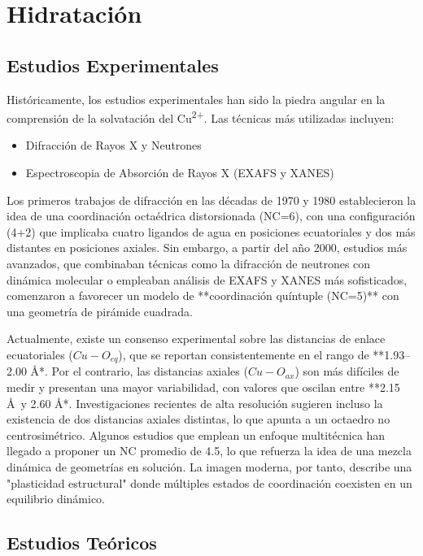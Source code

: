 \section{Hidratación}

\subsection*{Estudios Experimentales}

Históricamente, los estudios experimentales han sido la piedra angular en la comprensión de la solvatación del Cu\textsuperscript{2+}. Las técnicas más utilizadas incluyen:
\begin{itemize}
    \item Difracción de Rayos X y Neutrones
    \item Espectroscopia de Absorción de Rayos X (EXAFS y XANES)
\end{itemize}

Los primeros trabajos de difracción en las décadas de 1970 y 1980 establecieron la idea de una coordinación octaédrica distorsionada (NC=6), con una configuración (4+2) que implicaba cuatro ligandos de agua en posiciones ecuatoriales y dos más distantes en posiciones axiales. Sin embargo, a partir del año 2000, estudios más avanzados, que combinaban técnicas como la difracción de neutrones con dinámica molecular o empleaban análisis de EXAFS y XANES más sofisticados, comenzaron a favorecer un modelo de **coordinación quíntuple (NC=5)** con una geometría de pirámide cuadrada.

Actualmente, existe un consenso experimental sobre las distancias de enlace ecuatoriales ($Cu-O_{eq}$), que se reportan consistentemente en el rango de **1.93--2.00 \AA**. Por el contrario, las distancias axiales ($Cu-O_{ax}$) son más difíciles de medir y presentan una mayor variabilidad, con valores que oscilan entre **2.15 \AA \ y 2.60 \AA**. Investigaciones recientes de alta resolución sugieren incluso la existencia de dos distancias axiales distintas, lo que apunta a un octaedro no centrosimétrico. Algunos estudios que emplean un enfoque multitécnica han llegado a proponer un NC promedio de 4.5, lo que refuerza la idea de una mezcla dinámica de geometrías en solución. La imagen moderna, por tanto, describe una "plasticidad estructural" donde múltiples estados de coordinación coexisten en un equilibrio dinámico.

\subsection*{Estudios Teóricos}

